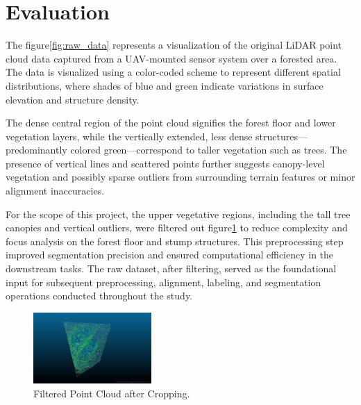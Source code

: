 \documentclass[../report.tex]{subfiles}
\begin{document}
\section{Evaluation}
\label{sec:evaluation}
    
    The figure\ref{fig:raw_data} represents a visualization of the original LiDAR point cloud data captured from a UAV-mounted sensor system over a forested area. The data is visualized using a color-coded scheme to represent different spatial distributions, where shades of blue and green indicate variations in surface elevation and structure density.
    
    The dense central region of the point cloud signifies the forest floor and lower vegetation layers, while the vertically extended, less dense structures—predominantly colored green—correspond to taller vegetation such as trees. The presence of vertical lines and scattered points further suggests canopy-level vegetation and possibly sparse outliers from surrounding terrain features or minor alignment inaccuracies.
    
    For the scope of this project, the upper vegetative regions, including the tall tree canopies and vertical outliers, were filtered out figure\ref{fig:filtered_point_cloud} to reduce complexity and focus analysis on the forest floor and stump structures. This preprocessing step improved segmentation precision and ensured computational efficiency in the downstream tasks. The raw dataset, after filtering, served as the foundational input for subsequent preprocessing, alignment, labeling, and segmentation operations conducted throughout the study.
\begin{figure}[H]
    \centering
    \includegraphics[width=0.4\textwidth]{rnd-project-report-main/figures/filtered_point_cloud.png}
    \caption{Filtered Point Cloud after Cropping.}
    \label{fig:filtered_point_cloud}
\end{figure}
\end{document}
